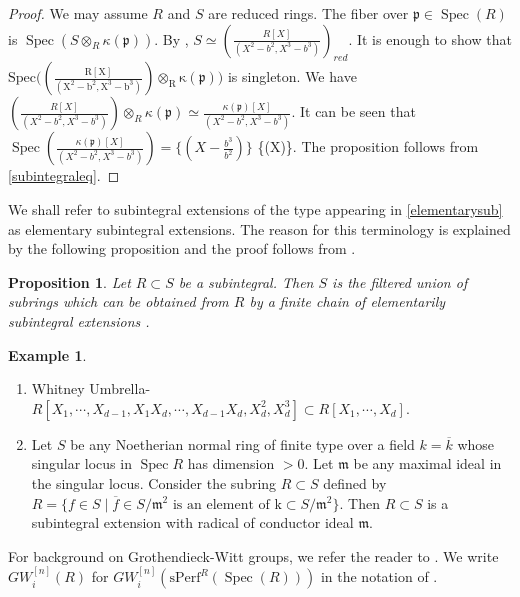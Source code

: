 \documentclass[11pt,a4paper]{amsart}
\theoremstyle{plain}
\newtheorem{prop}[thm]{Proposition}
\theoremstyle{definition}
\newtheorem{ex}[thm]{Example}
\theoremstyle{remark}
\begin{document}
\begin{proof}
    We may assume $R$ and $S$ are reduced rings. The fiber over $\mathfrak{p}\in\operatorname{Spec}(R)$ is $\operatorname{Spec}(S\otimes_R\kappa(\mathfrak{p}))$. By \cite[Lemma 4.4]{swan1980seminormality}, $S\simeq (\frac{R[X]}{(X^2-b^2, X^3-b^3) })_{red}$. It is enough to show that $\operatorname{Spec((\frac{R[X]}{(X^2-b^2, X^3-b^3) })\otimes_R\kappa(\mathfrak{p})})$ is singleton. We have $(\frac{R[X]}{(X^2-b^2, X^3-b^3) })\otimes_R\kappa(\mathfrak{p})\simeq \frac{\kappa(\mathfrak{p})[X]}{(X^2-b^2, X^3-b^3) }$. It can be seen that $\operatorname{Spec}(\frac{\kappa(\mathfrak{p})[X]}{(X^2-b^2, X^3-b^3) })=\{(X-\frac{b^3}{b^2})\}$  \{(X)\}. The proposition follows from \ref{subintegraleq}. 
\end{proof}
  \fi   
We shall refer to subintegral extensions of the type appearing in \ref{elementarysub} as elementary subintegral extensions. The reason for this terminology is explained by the following proposition and the proof follows from \cite[Lemma 2.3, Lemma 2.6]{swan1980seminormality}.
\begin{prop}\label{etaelementary}
    Let $R\subset S$ be a  subintegral. Then $S$ is the filtered union of subrings which can be obtained from $R$ by a finite chain of elementarily subintegral extensions .
\end{prop}

\begin{ex}
\begin{enumerate}
The following are examples of subintegral extensions.
    \item Whitney Umbrella- $R[X_1,\cdots, X_{d-1}, X_1X_d, 
\cdots ,X_{d-1}X_d, X_d^2,X_d^3] \subset R[X_1,\cdots, X_d]$. 
    \item Let $S$ be any Noetherian normal ring of finite type over a field $k=\overline{k}$ whose singular locus in $\operatorname{Spec}R$ has dimension $>0$. Let $\mathfrak{m}$ be any maximal ideal in the singular locus. Consider the subring $R\subset S$ defined by
$R = \{f \in S \mid \overline{f}\in S/\mathfrak{m}^2 \text{ is an element of k} \subset S/\mathfrak{m}^2\}$. Then $R\subset S$ is a subintegral extension with radical of conductor ideal $\mathfrak{m}$. 

\end{enumerate}
\end{ex}
For background on Grothendieck-Witt groups, we refer the reader to \cite{schlichting2017hermitian}. We write $GW^{[n]}_i(R)$ for $GW^{[n]}_i(\mathrm{sPerf}^R(\operatorname{Spec}(R)))$ in the notation of \cite[Definition 9.1]{schlichting2017hermitian}. 
\end{document}
